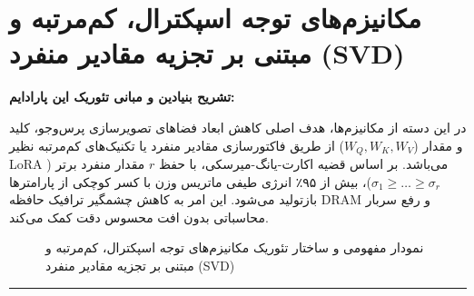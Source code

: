 \section{مکانیزم‌های توجه اسپکترال، کم‌مرتبه و مبتنی بر تجزیه مقادیر منفرد (SVD)}

\textbf{تشریح بنیادین و مبانی تئوریک این پارادایم:}

در این دسته از مکانیزم‌ها، هدف اصلی کاهش ابعاد فضاهای تصویرسازی پرس‌وجو، کلید و مقدار ($W_Q, W_K, W_V$) از طریق فاکتورسازی مقادیر منفرد یا تکنیک‌های کم‌مرتبه نظیر LoRA می‌باشد. بر اساس قضیه اکارت-یانگ-میرسکی، با حفظ $r$ مقدار منفرد برتر ($\sigma_1 \ge \dots \ge \sigma_r$)، بیش از ۹۵٪ انرژی طیفی ماتریس وزن با کسر کوچکی از پارامترها بازتولید می‌شود. این امر به کاهش چشمگیر ترافیک حافظه DRAM و رفع سربار محاسباتی بدون افت محسوس دقت کمک می‌کند.

\begin{figure}[H]
\centering
{}
\caption{نمودار مفهومی و ساختار تئوریک مکانیزم‌های توجه اسپکترال، کم‌مرتبه و مبتنی بر تجزیه مقادیر منفرد (SVD)}
\end{figure}

\vspace{0.4cm}
\hrule
\vspace{0.4cm}

